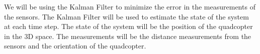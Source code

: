 \documentclass[12pt]{article}
\numberwithin{equation}{section}
\begin{document}
We will be using the Kalman Filter to minimize the error in the measurements of the sensors. The Kalman Filter will be used to estimate the state of the system at each time step. The state of the system will be the position of the quadcopter in the 3D space. The measurements will be the distance measurements from the sensors and the orientation of the quadcopter.
\end{document}
